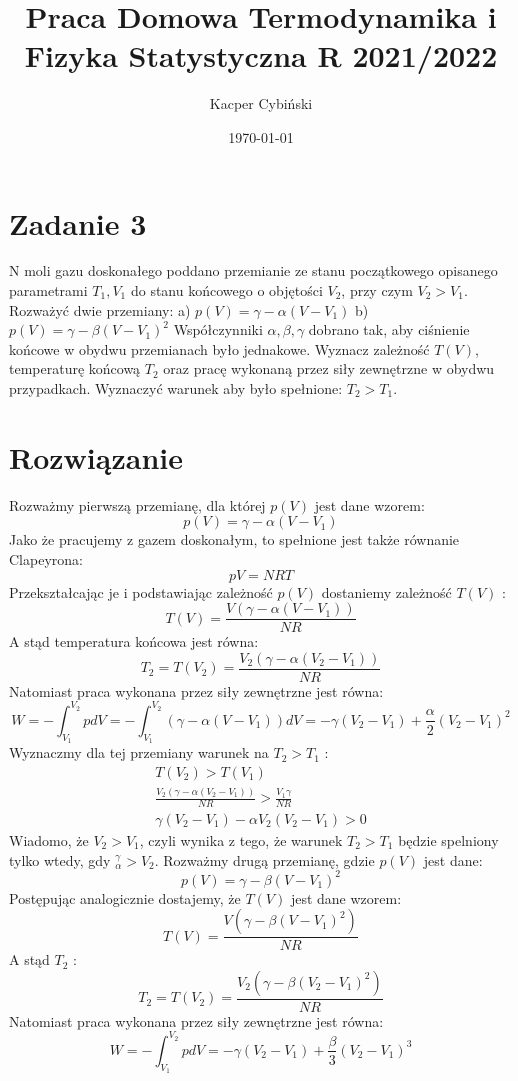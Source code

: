 \documentclass[12pt,a4paper]{article}
\title{Praca Domowa Termodynamika i Fizyka Statystyczna R 2021/2022}
\author{Kacper Cybiński}
\date{\today}
\begin{document}
\maketitle

\section{Zadanie 3}

N moli gazu doskonałego poddano przemianie ze stanu początkowego opisanego parametrami $T_{1}, V_{1}$ do stanu końcowego o objętości $V_{2}$, przy czym $V_{2}>V_{1}$. Rozważyć dwie przemiany:
a) $p(V)=\gamma-\alpha\left(V-V_{1}\right)$
b) $p(V)=\gamma-\beta\left(V-V_{1}\right)^{2}$
Współczynniki $\alpha, \beta, \gamma$ dobrano tak, aby ciśnienie końcowe w obydwu przemianach było jednakowe. Wyznacz zależność $T(V)$, temperaturę końcową $T_{2}$ oraz pracę wykonaną przez siły zewnętrzne w obydwu przypadkach. Wyznaczyć warunek aby było spełnione: $T_{2}>T_{1}$.

\section{Rozwiązanie}

Rozważmy pierwszą przemianę, dla której $p(V)$ jest dane wzorem:
$$
p(V)=\gamma-\alpha\left(V-V_{1}\right)
$$
Jako że pracujemy z gazem doskonałym, to spełnione jest także równanie Clapeyrona:
$$
p V=N R T
$$
Przekształcając je i podstawiając zależność $p(V)$ dostaniemy zależność $T(V)$ :
$$
T(V)=\frac{V\left(\gamma-\alpha\left(V-V_{1}\right)\right)}{N R}
$$
A stąd temperatura końcowa jest równa:
$$
T_{2}=T\left(V_{2}\right)=\frac{V_{2}\left(\gamma-\alpha\left(V_{2}-V_{1}\right)\right)}{N R}
$$
Natomiast praca wykonana przez siły zewnętrzne jest równa:
$$
W=-\int_{V_{1}}^{V_{2}} p d V=-\int_{V_{1}}^{V_{2}}\left(\gamma-\alpha\left(V-V_{1}\right)\right) d V=-\gamma\left(V_{2}-V_{1}\right)+\frac{\alpha}{2}\left(V_{2}-V_{1}\right)^{2}
$$
Wyznaczmy dla tej przemiany warunek na $T_{2}>T_{1}$ :
$$
\begin{gathered}
T\left(V_{2}\right)>T\left(V_{1}\right) \\
\frac{V_{2}\left(\gamma-\alpha\left(V_{2}-V_{1}\right)\right)}{N R}>\frac{V_{1} \gamma}{N R} \\
\gamma\left(V_{2}-V_{1}\right)-\alpha V_{2}\left(V_{2}-V_{1}\right)>0
\end{gathered}
$$
Wiadomo, że $V_{2}>V_{1}$, czyli wynika z tego, że warunek $T_{2}>T_{1}$ będzie spelniony tylko wtedy, gdy ${ }_{\alpha}^{\gamma}>V_{2}$. Rozważmy drugą przemianę, gdzie $p(V)$ jest dane:
$$
p(V)=\gamma-\beta\left(V-V_{1}\right)^{2}
$$
Postępując analogicznie dostajemy, że $T(V)$ jest dane wzorem:
$$
T(V)=\frac{V\left(\gamma-\beta\left(V-V_{1}\right)^{2}\right)}{N R}
$$
A stąd $T_{2}$ :
$$
T_{2}=T\left(V_{2}\right)=\frac{V_{2}\left(\gamma-\beta\left(V_{2}-V_{1}\right)^{2}\right)}{N R}
$$
Natomiast praca wykonana przez siły zewnętrzne jest równa:
$$
W=-\int_{V_{1}}^{V_{2}} p d V=-\gamma\left(V_{2}-V_{1}\right)+\frac{\beta}{3}\left(V_{2}-V_{1}\right)^{3}
$$
\end{document}
